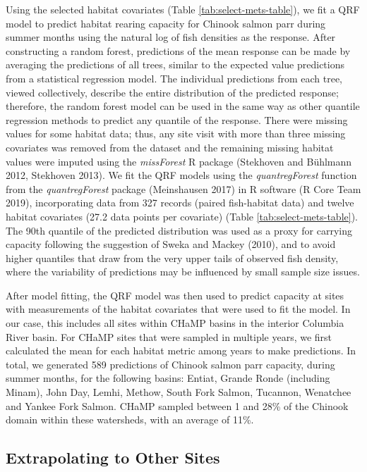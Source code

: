 \documentclass[
  12pt,
]{article}
\begin{document}
Using the selected habitat covariates (Table \ref{tab:select-mets-table}), we fit a QRF model to predict habitat rearing capacity for Chinook salmon parr during summer months using the natural log of fish densities as the response. After constructing a random forest, predictions of the mean response can be made by averaging the predictions of all trees, similar to the expected value predictions from a statistical regression model. The individual predictions from each tree, viewed collectively, describe the entire distribution of the predicted response; therefore, the random forest model can be used in the same way as other quantile regression methods to predict any quantile of the response. There were missing values for some habitat data; thus, any site visit with more than three missing covariates was removed from the dataset and the remaining missing habitat values were imputed using the \emph{missForest} R package (Stekhoven and Bühlmann 2012, Stekhoven 2013). We fit the QRF models using the \emph{quantregForest} function from the \emph{quantregForest} package (Meinshausen 2017) in R software (R Core Team 2019), incorporating data from 327 records (paired fish-habitat data) and twelve habitat covariates (27.2 data points per covariate) (Table \ref{tab:select-mets-table}). The 90th quantile of the predicted distribution was used as a proxy for carrying capacity following the suggestion of Sweka and Mackey (2010), and to avoid higher quantiles that draw from the very upper tails of observed fish density, where the variability of predictions may be influenced by small sample size issues.

After model fitting, the QRF model was then used to predict capacity at sites with measurements of the habitat covariates that were used to fit the model. In our case, this includes all sites within CHaMP basins in the interior Columbia River basin. For CHaMP sites that were sampled in multiple years, we first calculated the mean for each habitat metric among years to make predictions. In total, we generated 589 predictions of Chinook salmon parr capacity, during summer months, for the following basins: Entiat, Grande Ronde (including Minam), John Day, Lemhi, Methow, South Fork Salmon, Tucannon, Wenatchee and Yankee Fork Salmon. CHaMP sampled between 1 and 28\% of the Chinook domain within these watersheds, with an average of 11\%.

\hypertarget{extrapolating-to-other-sites}{%
\subsection{Extrapolating to Other Sites}\label{extrapolating-to-other-sites}}
\end{document}
